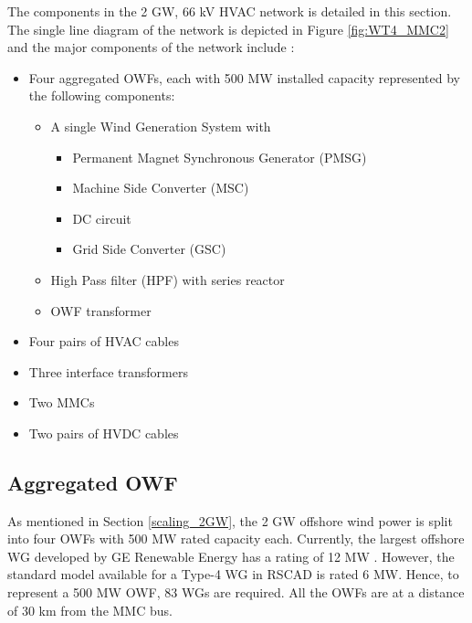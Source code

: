 The components in the 2 GW, 66 kV \gls{HVAC} network is detailed in this section. The single line diagram of the network is depicted in Figure \ref{fig:WT4_MMC2} and the major components of the network include :
\begin{itemize}
    \item Four aggregated \gls{OWF}s, each with 500 MW installed capacity represented by the following components:
    \begin{itemize}
        \item A single Wind Generation System with 
    \begin{itemize}
        \item Permanent Magnet Synchronous Generator (\gls{PMSG})
        \item Machine Side Converter (\gls{MSC})
        \item \gls{DC} circuit
        \item Grid Side Converter (\gls{GSC}) 
    \end{itemize}
        \item High Pass filter (\gls{HPF}) with series reactor
        \item \gls{OWF} transformer
    \end{itemize}
    \item Four pairs of \gls{HVAC} cables  
    \item Three interface transformers
    \item Two \gls{MMC}s
    \item Two pairs of \gls{HVDC} cables
\end{itemize}

\subsection{Aggregated OWF}\label{Aggregated_OWF_large_scale}
As mentioned in Section \ref{scaling_2GW}, the 2 GW offshore wind power is split into four \gls{OWF}s with 500 MW rated capacity each. Currently, the largest offshore \gls{WG} developed by GE Renewable Energy has a rating of 12 MW \cite{noauthor_worlds_2020}. However, the standard model available for a Type-4 \gls{WG} in RSCAD is rated 6 MW. Hence, to represent a 500 MW \gls{OWF}, 83 \gls{WG}s are required. All the \gls{OWF}s are at a distance of 30 km from the \gls{MMC} bus. 


